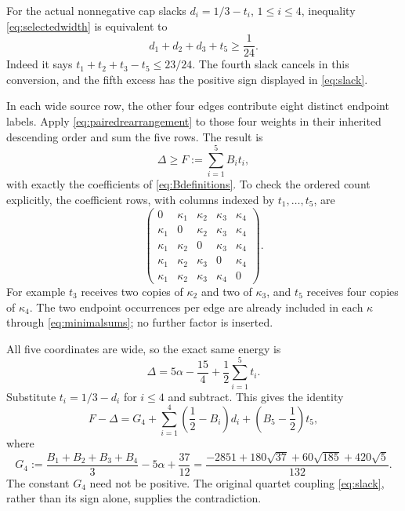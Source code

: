 \documentclass[11pt]{article}
\theoremstyle{definition}
\theoremstyle{remark}
\begin{document}
For the actual nonnegative cap slacks $d_i=1/3-t_i$, $1\leq i\leq4$,
inequality \eqref{eq:selectedwidth} is equivalent to
\begin{equation}\label{eq:slack}
 d_1+d_2+d_3+t_5\geq\frac1{24}.
\end{equation}
Indeed it says $t_1+t_2+t_3-t_5\leq23/24$. The fourth slack cancels
in this conversion, and the fifth excess has the positive sign displayed
in \eqref{eq:slack}.

In each wide source row, the other four edges contribute eight distinct
endpoint labels. Apply \eqref{eq:pairedrearrangement} to those four
weights in their inherited descending order and sum the five rows.
The result is
\begin{equation}\label{eq:finallower}
 \Delta\geq F:=\sum_{i=1}^5B_it_i,
\end{equation}
with exactly the coefficients of \eqref{eq:Bdefinitions}. To check the
ordered count explicitly, the coefficient rows, with columns indexed by
$t_1,\ldots,t_5$, are
\begin{equation}\label{eq:coefficientmatrix}
 \begin{pmatrix}
 0&\kappa_1&\kappa_2&\kappa_3&\kappa_4\\
 \kappa_1&0&\kappa_2&\kappa_3&\kappa_4\\
 \kappa_1&\kappa_2&0&\kappa_3&\kappa_4\\
 \kappa_1&\kappa_2&\kappa_3&0&\kappa_4\\
 \kappa_1&\kappa_2&\kappa_3&\kappa_4&0
 \end{pmatrix}.
\end{equation}
For example $t_3$ receives two copies of $\kappa_2$ and two of
$\kappa_3$, and $t_5$ receives four copies of $\kappa_4$.
The two endpoint occurrences per edge are already included in each
$\kappa$ through \eqref{eq:minimalsums}; no further factor is inserted.

All five coordinates are wide, so the exact same energy is
\[
 \Delta=5\alpha-\frac{15}{4}+\frac12\sum_{i=1}^5t_i.
\]
Substitute $t_i=1/3-d_i$ for $i\leq4$ and subtract. This gives the
identity
\begin{equation}\label{eq:slackidentity}
 F-\Delta=G_4+\sum_{i=1}^4\left(\frac12-B_i\right)d_i
                 +\left(B_5-\frac12\right)t_5,
\end{equation}
where
\begin{equation}\label{eq:G4}
 G_4:=\frac{B_1+B_2+B_3+B_4}{3}-5\alpha+\frac{37}{12}
 =\frac{-2851+180\sqrt{37}+60\sqrt{185}+420\sqrt5}{132}.
\end{equation}
The constant $G_4$ need not be positive. The original quartet coupling
\eqref{eq:slack}, rather than its sign alone, supplies the contradiction.
\end{document}
